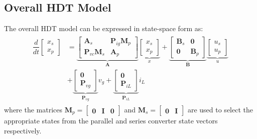 \subsection{Overall HDT Model}
The overall HDT model can be expressed in state-space form as:
\begin{align}
    \begin{aligned}
        \dfrac{d}{dt}
        \begin{bmatrix}
            x_s\\
            x_p
        \end{bmatrix}
        &=
        \underbrace{
        \begin{bmatrix}
            \mathbf{A}_s & \mathbf{P}_{ig}\mathbf{M}_p \\
            \mathbf{P}_{vc}\mathbf{M}_s & \mathbf{A}_p
        \end{bmatrix}
        }_{\mathbf{A}}
        \underbrace{
        \begin{bmatrix}
            x_s\\
            x_p
        \end{bmatrix}
        }_{x}
        +
        \underbrace{
        \begin{bmatrix}
            \mathbf{B}_s & \mathbf{0} \\
            \mathbf{0} & \mathbf{B}_p
        \end{bmatrix}
        }_{\mathbf{B}}
        \underbrace{
        \begin{bmatrix}
            u_s\\
            u_p 
        \end{bmatrix}
        }_{u}
        \\
        &+
        \underbrace{
        \begin{bmatrix}
            \mathbf{0}\\
            \mathbf{P}_{vg}
        \end{bmatrix}
        }_{\mathbf{P}_{vg}}
        v_g
        +
        \underbrace{
        \begin{bmatrix}
            \mathbf{0}\\
            \mathbf{P}_{iL}
        \end{bmatrix}
        }_{\mathbf{P}_{iL}}
        i_L
    \end{aligned}
\end{align}
where the matrices $\mathbf{M}_p = \begin{bmatrix}\mathbf{0} & \mathbf{I} & \mathbf{0}\end{bmatrix}$ and $\mathbf{M}_s = \begin{bmatrix}\mathbf{0} & \mathbf{I}\end{bmatrix}$ are used to select the appropriate states from the parallel and series converter state vectors respectively.

